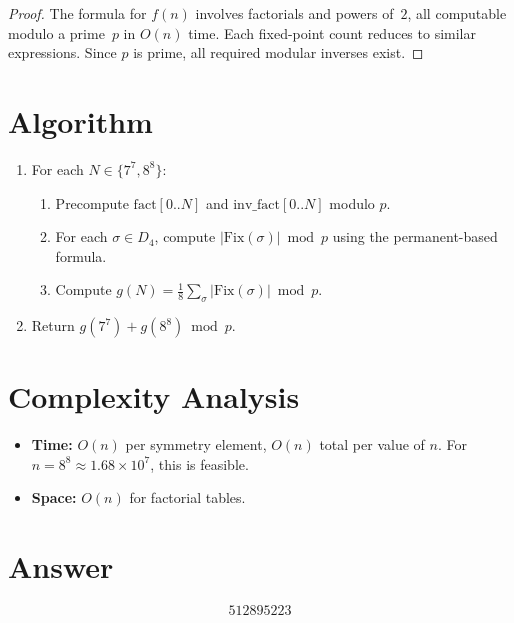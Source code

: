 \documentclass[11pt]{article}
\theoremstyle{definition}
\begin{document}
\begin{proof}
The formula for $f(n)$ involves factorials and powers of~$2$, all computable modulo a prime~$p$ in $O(n)$ time. Each fixed-point count reduces to similar expressions. Since $p$ is prime, all required modular inverses exist.
\end{proof}

\section{Algorithm}

\begin{enumerate}
\item For each $N \in \{7^7, 8^8\}$:
  \begin{enumerate}
  \item Precompute $\mathrm{fact}[0..N]$ and $\mathrm{inv\_fact}[0..N]$ modulo $p$.
  \item For each $\sigma \in D_4$, compute $|\mathrm{Fix}(\sigma)| \bmod p$ using the permanent-based formula.
  \item Compute $g(N) = \frac{1}{8}\sum_\sigma |\mathrm{Fix}(\sigma)| \bmod p$.
  \end{enumerate}
\item Return $g(7^7) + g(8^8) \bmod p$.
\end{enumerate}

\section{Complexity Analysis}

\begin{itemize}
\item \textbf{Time:} $O(n)$ per symmetry element, $O(n)$ total per value of $n$. For $n = 8^8 \approx 1.68 \times 10^7$, this is feasible.
\item \textbf{Space:} $O(n)$ for factorial tables.
\end{itemize}

\section{Answer}

\[
\boxed{512895223}
\]
\end{document}
